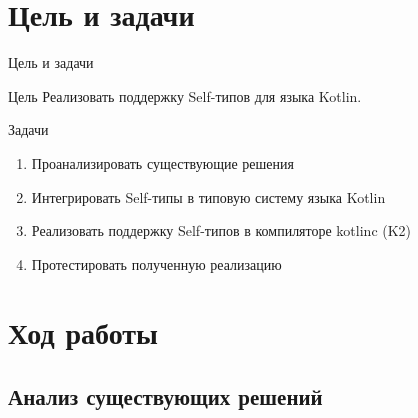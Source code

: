 \documentclass[aspectratio=169,usenames,dvipsnames]{beamer}
\begin{document}
    \section{Цель и задачи}

    \begin{frame}[fragile]{Цель и задачи}

        \begin{block}{Цель}
            Реализовать поддержку Self-типов для языка Kotlin.
        \end{block}

        \begin{block}{Задачи}
            \begin{enumerate}
                \item Проанализировать существующие решения
                \item Интегрировать Self-типы в типовую систему языка Kotlin
                \item Реализовать поддержку Self-типов в компиляторе kotlinc (K2)
                \item Протестировать полученную реализацию
            \end{enumerate}
        \end{block}
    \end{frame}


    \section{Ход работы}


    \subsection{Анализ существующих решений}
\end{document}
